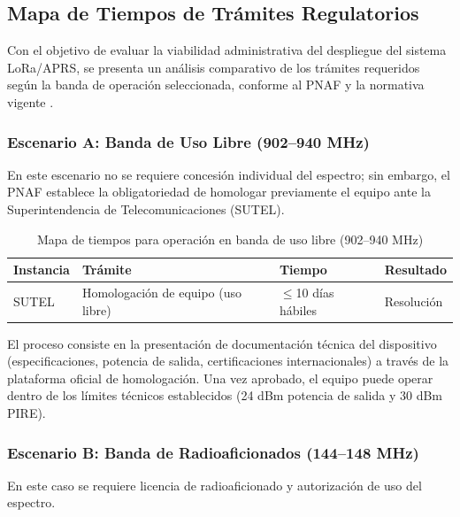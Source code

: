 \documentclass[conference]{IEEEtran}
\begin{document}
\subsection{Mapa de Tiempos de Trámites Regulatorios}
Con el objetivo de evaluar la viabilidad administrativa del despliegue del sistema LoRa/APRS, se presenta un análisis comparativo de los trámites requeridos según la banda de operación seleccionada, conforme al PNAF y la normativa vigente \cite{pnaf_2023_micitt,sutel_homologacion_2018,sutel_radioaficionados}.

\subsubsection{Escenario A: Banda de Uso Libre (902--940 MHz)}
En este escenario no se requiere concesión individual del espectro; sin embargo, el PNAF establece la obligatoriedad de homologar previamente el equipo ante la Superintendencia de Telecomunicaciones (SUTEL).

\begin{table}[t]
\caption{Mapa de tiempos para operación en banda de uso libre (902--940 MHz)}
\label{tab:mapa_tiempos_uso_libre}
\centering
\scriptsize
\setlength{\tabcolsep}{3pt}
\renewcommand{\arraystretch}{1.15}
\begin{tabularx}{\columnwidth}{@{}l X l l@{}}
\toprule
\textbf{Instancia} & \textbf{Trámite} & \textbf{Tiempo} & \textbf{Resultado} \\
\midrule
SUTEL & Homologación de equipo (uso libre) & $\leq$10 días hábiles & Resolución \\
\bottomrule
\end{tabularx}
\end{table}

El proceso consiste en la presentación de documentación técnica del dispositivo (especificaciones, potencia de salida, certificaciones internacionales) a través de la plataforma oficial de homologación. Una vez aprobado, el equipo puede operar dentro de los límites técnicos establecidos (24 dBm potencia de salida y 30 dBm PIRE).

\subsubsection{Escenario B: Banda de Radioaficionados (144--148 MHz)}
En este caso se requiere licencia de radioaficionado y autorización de uso del espectro.
\end{document}
